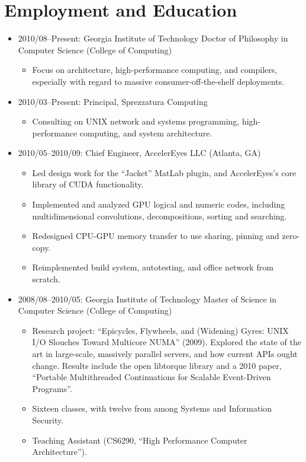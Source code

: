 \documentclass[11pt]{article}
\newenvironment{tightitemize}
{\begin{itemize}
  \setlength{\itemsep}{1pt}
  \setlength{\parskip}{0pt}
  \setlength{\parsep}{0pt}}
{\end{itemize}}
\begin{document}
\section{Employment and Education}
\begin{tightitemize}
\item 2010/08--Present: Georgia Institute of Technology
Doctor of Philosophy in Computer Science (College of Computing)

\begin{tightitemize}
\item Focus on architecture, high-performance computing, and compilers,
  especially with regard to massive consumer-off-the-shelf deployments.
\end{tightitemize}

\item 2010/03--Present: Principal, Sprezzatura Computing

\begin{tightitemize}
\item Consulting on UNIX network and systems programming, high-performance
  computing, and system architecture.
\end{tightitemize}

\item 2010/05--2010/09: Chief Engineer, AccelerEyes LLC (Atlanta, GA)
\begin{tightitemize}
\item Led design work for the ``Jacket'' MatLab plugin, and AccelerEyes's core library of CUDA functionality.
\item Implemented and analyzed GPU logical and numeric codes, including multidimensional convolutions, decompositions, sorting and searching.
\item Redesigned CPU-GPU memory transfer to use sharing, pinning and zero-copy.
\item Reimplemented build system, autotesting, and office network from scratch.
\end{tightitemize}

\item 2008/08--2010/05: Georgia Institute of Technology
Master of Science in Computer Science (College of Computing)

\begin{tightitemize}
\item Research project: ``Epicycles, Flywheels, and (Widening) Gyres: UNIX I/O
  Slouches Toward Multicore NUMA'' (2009). Explored the state of the art in
  large-scale, massively parallel servers, and how current APIs ought
  change. Results include the open libtorque library and a 2010 paper,
  ``Portable Multithreaded Continuations for Scalable Event-Driven Programs''.
\item Sixteen classes, with twelve from among Systems and Information Security.
\item Teaching Assistant (CS6290, ``High Performance Computer Architecture'').
\end{tightitemize}


\end{tightitemize}
\end{document}
